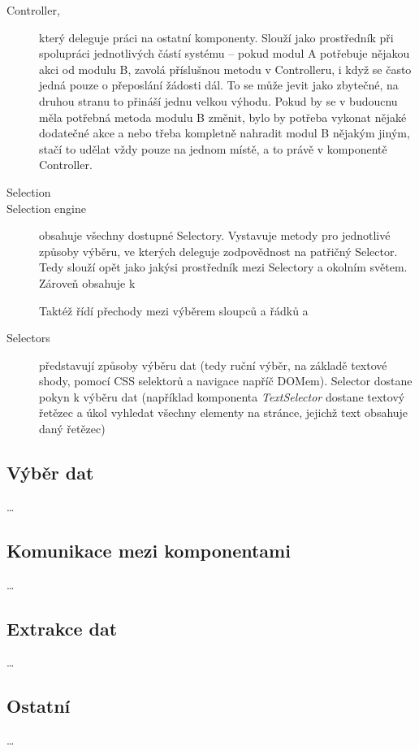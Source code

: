 \documentclass[thesis=B,czech]{FITthesis}[2012/06/26]
\begin{document}
\begin{description}
	\item [Controller,] který deleguje práci na ostatní komponenty. Slouží jako prostředník při spolupráci jednotlivých částí systému -- pokud modul A potřebuje nějakou akci od modulu B, zavolá příslušnou metodu v Controlleru, i když se často jedná pouze o přeposlání žádosti dál. To se může jevit jako zbytečné, na druhou stranu to přináší jednu velkou výhodu. Pokud by se v budoucnu měla potřebná metoda modulu B změnit, bylo by potřeba vykonat nějaké dodatečné akce a nebo třeba kompletně nahradit modul B nějakým jiným, stačí to udělat vždy pouze na jednom místě, a to právě v komponentě Controller.
	\item [Selection] 
	\item [Selection engine] obsahuje všechny dostupné Selectory. Vystavuje metody pro jednotlivé způsoby výběru, ve kterých deleguje zodpovědnost na patřičný Selector. Tedy slouží opět jako jakýsi prostředník mezi Selectory a okolním světem. Zároveň obsahuje k
	
	Taktéž řídí přechody mezi výběrem sloupců a řádků a 
	\item [Selectors] představují způsoby výběru dat (tedy ruční výběr, na základě textové shody, pomocí CSS selektorů a navigace napříč DOMem). Selector dostane pokyn k výběru dat (například komponenta \textit{TextSelector} dostane textový řetězec a úkol vyhledat všechny elementy na stránce, jejichž text obsahuje daný řetězec)
\end{description}

\subsection{Výběr dat}
\dots

\subsection{Komunikace mezi komponentami}
\dots

\subsection{Extrakce dat}
\dots

\subsection{Ostatní}
\dots
\end{document}
